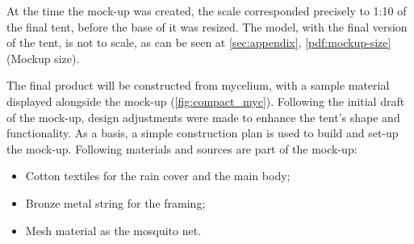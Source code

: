 \documentclass{article}
\begin{document}
At the time the mock-up was created, the scale corresponded precisely to 1:10 of the final
tent, before the base of it was resized. The model, with the final version of the tent, is
not to scale, as can be seen at \autoref{sec:appendix}, \autoref{pdf:mockup-size} (Mockup size).

The final product will be constructed from mycelium, with a sample material displayed
alongside the mock-up (\autoref{fig:compact_myc}). Following the initial draft of the
mock-up, design adjustments were made to enhance the tent's shape and functionality. As a
basis, a simple construction plan is used to build and set-up the mock-up. Following
materials and sources are part of the mock-up:
\begin{itemize}
    \item Cotton textiles for the rain cover and the main body;
    \item Bronze metal string for the framing;
    \item Mesh material as the mosquito net.
\end{itemize}
\end{document}
